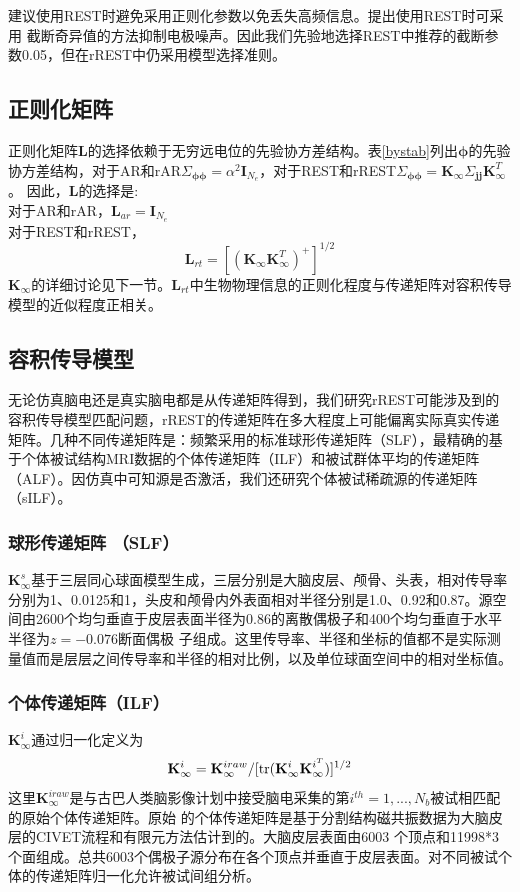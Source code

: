 \cite{yao_method_2001}建议使用REST时避免采用正则化参数以免丢失高频信息。\cite{zhai_y_and_yao_d_study_2004}提出使用REST时可采用
截断奇异值的方法抑制电极噪声。因此我们先验地选择REST中推荐的截断参数0.05，但在rREST中仍采用模型选择准则。
\subsection{正则化矩阵}
正则化矩阵$\mathbf{L}$的选择依赖于无穷远电位的先验协方差结构。表\ref{bystab}列出$\mathbf{\phi}$的先验协方差结构，对于AR和rAR$\Sigma_{\mathbf{\phi\phi}}=\alpha^{2}\mathbf{I}_{N_e}$，对于REST和rREST$\Sigma_{\mathbf{\phi\phi}}=\mathbf{K}_{\infty}\Sigma_{\mathbf{jj}}\mathbf{K}_{\infty}^T$。 因此，$\mathbf{L}$的选择是:\\
对于AR和rAR，$\mathbf{L}_{ar} =\mathbf{I}_{N_e}$\\
对于REST和rREST，
\begin{equation}\label{eq3.17}
\mathbf{L}_{rt} =[(\mathbf{K}_\infty\mathbf{K}_\infty^T)^+]^{1/2}
\end{equation}
$\mathbf{K}_\infty$的详细讨论见下一节。$\mathbf{L}_{rt}$中生物物理信息的正则化程度与传递矩阵对容积传导模型的近似程度正相关。
\subsection{容积传导模型}
无论仿真脑电还是真实脑电都是从传递矩阵得到，我们研究rREST可能涉及到的容积传导模型匹配问题，rREST的传递矩阵在多大程度上可能偏离实际真实传递矩阵。几种不同传递矩阵是：频繁采用的标准球形传递矩阵（SLF），最精确的基于个体被试结构MRI数据的个体传递矩阵（ILF）和被试群体平均的传递矩阵（ALF）。因仿真中可知源是否激活，我们还研究个体被试稀疏源的传递矩阵（sILF）。
\subsubsection{球形传递矩阵 （SLF）}
$\mathbf{K}_{\infty}^{s}$基于三层同心球面模型生成，三层分别是大脑皮层、颅骨、头表，相对传导率分别为1、0.0125和1，头皮和颅骨内外表面相对半径分别是1.0、0.92和0.87。源空间由2600个均匀垂直于皮层表面半径为0.86的离散偶极子和400个均匀垂直于水平半径为$z=-0.076$断面偶极
子组成。这里传导率、半径和坐标的值都不是实际测量值而是层层之间传导率和半径的相对比例，以及单位球面空间中的相对坐标值。
\subsubsection{个体传递矩阵（ILF）}
$\mathbf{K}_{\infty}^i$通过归一化定义为
\begin{equation*}
\mathbf{K}_\infty^i=\mathbf{K}_\infty^{iraw}/{[\operatorname{tr}(\mathbf{K}_\infty^i\mathbf{K}_\infty^{i^T})]^{1/2}}
\end{equation*}
这里$\mathbf{K}_{\infty}^{iraw}$是与古巴人类脑影像计划中接受脑电采集的第$i^{th}=1,...,N_b$被试相匹配的原始个体传递矩阵。原始
的个体传递矩阵是基于分割结构磁共振数据为大脑皮层的CIVET流程和有限元方法估计到的。大脑皮层表面由6003
个顶点和11998*3个面组成。总共6003个偶极子源分布在各个顶点并垂直于皮层表面。对不同被试个体的传递矩阵归一化允许被试间组分析。

